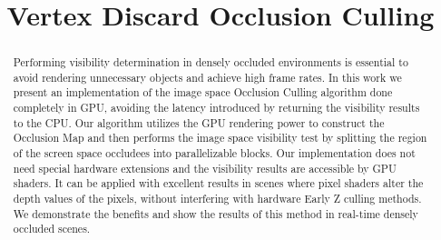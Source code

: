 \documentclass[10pt, conference]{IEEEtran}
\begin{document}
%
\title{Vertex Discard Occlusion Culling}

\newif\iffinal
\finaltrue
\newcommand{\jemsid}{99999}



\iffinal
  \author{%
  
  }
\else
  \author{Sibgrapi paper ID: \jemsid \\ }
\fi







\maketitle


\begin{abstract}
Performing visibility determination in densely occluded environments is essential to avoid rendering unnecessary objects and achieve high frame rates. 
In this work we present an implementation of the image space Occlusion Culling algorithm done completely in GPU, avoiding the latency introduced by returning 
the visibility results to the CPU. 
Our algorithm utilizes the GPU rendering power to construct the Occlusion Map and then performs the image space visibility test by splitting the region of 
the screen space occludees into parallelizable blocks. 
Our implementation does not need special hardware extensions and the visibility results are accessible by GPU shaders. It can be applied with excellent 
results in scenes where pixel shaders alter the depth values of the pixels, without interfering with hardware Early Z culling methods. 
We demonstrate the benefits and show the results of this method in real-time densely occluded scenes.


\end{abstract}
\end{document}
